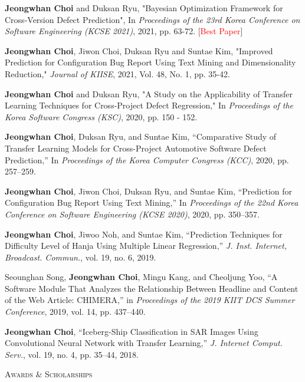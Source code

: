 \documentclass[10pt]{article}
\newenvironment{changemargin}[2]{
  \begin{list}{}{
    \setlength{\topsep}{0pt}
    \setlength{\leftmargin}{#1}
    \setlength{\rightmargin}{#2}
    \setlength{\listparindent}{\parindent}
    \setlength{\itemindent}{\parindent}
    \setlength{\parsep}{\parskip}
  }
  \item[]}{\end{list}
}
\newcommand{\lineover}{
	\begin{changemargin}{-0.05in}{-0.05in}
		\vspace*{-8pt}
		\hrulefill \\
		\vspace*{-2pt}
	\end{changemargin}
}
\newcommand{\header}[1]{
	\begin{changemargin}{-0.5in}{-0.5in}
		\scshape{#1}\\
  	\lineover
	\end{changemargin}
}
\newcommand{\presentation}[2]{
	{#1} \hfill \emph{#2}\\ \bigskip
}
\newcommand{\RED}[1]{\textcolor{red}{#1}}
\newenvironment{body} {
	\vspace*{-16pt}
	\begin{changemargin}{-0.25in}{-0.5in}
  }
	{\end{changemargin}
}
\begin{document}
\begin{body}
\presentation{\textbf{Jeongwhan Choi} and Duksan Ryu, "Bayesian Optimization Framework for Cross-Version Defect Prediction", In \emph{Proceedings of the 23rd Korea Conference on Software Engineering (KCSE 2021)}, 2021, pp. 63-72.  [\RED{Best Paper}]}{}
\presentation{\textbf{Jeongwhan Choi}, Jiwon Choi, Duksan Ryu and Suntae Kim, "Improved Prediction for Configuration Bug Report Using Text Mining and Dimensionality Reduction," \emph{Journal of KIISE}, 2021, Vol. 48, No. 1, pp. 35-42.}{}
\presentation{\textbf{Jeongwhan Choi} and Duksan Ryu, "A Study on the Applicability of Transfer Learning Techniques for Cross-Project Defect Regression," In \emph{Proceedings of the Korea Software Congress (KSC)}, 2020, pp. 150 - 152.}{}
\presentation{\textbf{Jeongwhan Choi}, Duksan Ryu, and Suntae Kim, “Comparative Study of Transfer Learning Models for Cross-Project Automotive Software Defect Prediction,” In \emph{Proceedings of the Korea Computer Congress (KCC)}, 2020, pp. 257–259.}{}
\presentation{\textbf{Jeongwhan Choi}, Jiwon Choi, Duksan Ryu, and Suntae Kim, “Prediction for Configuration Bug Report Using Text Mining,” In \emph{Proceedings of the 22nd Korea Conference on Software Engineering (KCSE 2020)}, 2020, pp. 350–357.}{}
\presentation{\textbf{Jeongwhan Choi}, Jiwoo Noh, and Suntae Kim, “Prediction Techniques for Difficulty Level of Hanja Using Multiple Linear Regression,” \emph{J. Inst. Internet, Broadcast. Commun.}, vol. 19, no. 6, 2019.}{}
\presentation{Seounghan Song, \textbf{Jeongwhan Choi}, Mingu Kang, and Cheoljung Yoo, “A Software Module That Analyzes the Relationship Between Headline and Content of the Web Article: CHIMERA,” in \emph{Proceedings of the 2019 KIIT DCS Summer Conference}, 2019, vol. 14, pp. 437–440.}{}
\presentation{\textbf{Jeongwhan Choi}, “Iceberg-Ship Classification in SAR Images Using Convolutional Neural Network with Transfer Learning,” \emph{J. Internet Comput. Serv.}, vol. 19, no. 4, pp. 35–44, 2018.}{}

\end{body}

\medskip

\header{Awards \& Scholarships}
\end{document}
